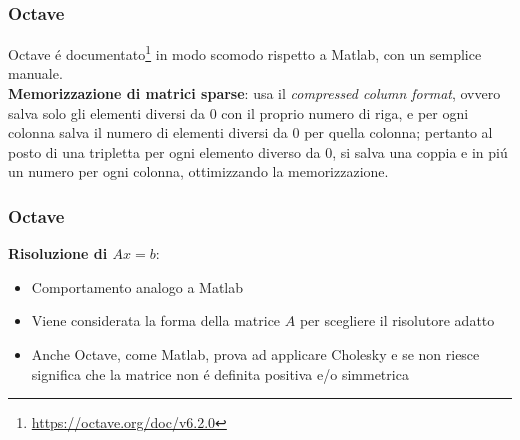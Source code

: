 \documentclass{beamer}
\begin{document}
\begin{frame}
\frametitle{Octave}
Octave \'e documentato\footnote{\url{https://octave.org/doc/v6.2.0}} in modo scomodo rispetto a Matlab, con un semplice manuale. \\
\textbf{Memorizzazione di matrici sparse}: usa il \textit{compressed column format}, ovvero
salva solo gli elementi diversi da 0 con il proprio numero di riga, e per ogni colonna salva il numero di elementi diversi da 0 per quella colonna; pertanto al posto di una tripletta per ogni elemento diverso da 0, si salva una coppia e in pi\'u un numero per ogni colonna, ottimizzando la memorizzazione.
\end{frame}
\begin{frame}
\frametitle{Octave}
\textbf{Risoluzione di $Ax = b$}:

\begin{itemize}
	\item Comportamento analogo a Matlab
	\item Viene considerata la forma della matrice $A$ per scegliere il risolutore adatto
	\item  Anche Octave, come Matlab, prova ad applicare Cholesky e se non riesce significa che la matrice non \'e definita positiva e/o simmetrica

\end{itemize}
\end{frame}
\end{document}
